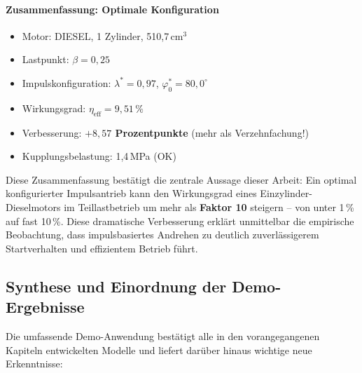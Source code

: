﻿\documentclass[a4paper,12pt]{article}
\begin{document}
\paragraph{Zusammenfassung: Optimale Konfiguration}

\begin{itemize}
  \item Motor: DIESEL, 1 Zylinder, 510{,}7\,cm$^3$
  \item Lastpunkt: $\beta = 0{,}25$
  \item Impulskonfiguration: $\lambda^* = 0{,}97$, $\varphi_0^* = 80{,}0^\circ$
  \item Wirkungsgrad: $\eta_\text{eff} = 9{,}51\,\%$
  \item Verbesserung: \textbf{$+8{,}57$ Prozentpunkte} (mehr als Verzehnfachung!)
  \item Kupplungsbelastung: 1{,}4\,MPa (OK)
\end{itemize}

Diese Zusammenfassung bestätigt die zentrale Aussage dieser Arbeit: Ein
optimal konfigurierter Impulsantrieb kann den Wirkungsgrad eines Einzylinder-Dieselmotors
im Teillastbetrieb um mehr als \textbf{Faktor 10} steigern -- von unter
1\,\% auf fast 10\,\%. Diese dramatische Verbesserung erklärt unmittelbar
die empirische Beobachtung, dass impulsbasiertes Andrehen zu deutlich
zuverlässigerem Startverhalten und effizientem Betrieb führt.

\subsection{Synthese und Einordnung der Demo-Ergebnisse}

Die umfassende Demo-Anwendung bestätigt alle in den vorangegangenen Kapiteln
entwickelten Modelle und liefert darüber hinaus wichtige neue Erkenntnisse:
\end{document}

